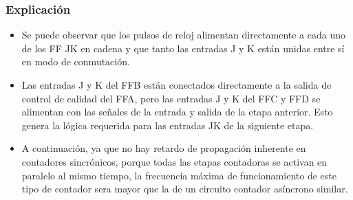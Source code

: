 \documentclass{beamer}
\begin{document}
\begin{frame}
\frametitle{Explicación}

\begin{itemize}
\item Se puede observar que los pulsos de reloj alimentan directamente a cada uno de los FF JK en cadena y que tanto las entradas J y K están unidas entre sí en modo de conmutación.

\item Las entradas J y K del FFB están conectados directamente a la salida de control de calidad del FFA, pero las entradas J y K del FFC y FFD se alimentan con las señales de la entrada y salida de la etapa anterior. Esto genera la lógica requerida para las entradas JK de la siguiente etapa.

\item A continuación, ya que no hay retardo de propagación inherente en contadores sincrónicos, porque todas las etapas contadoras se activan en paralelo al mismo tiempo, la frecuencia máxima de funcionamiento de este tipo de contador sera mayor que la de un circuito contador asíncrono similar.
\end{itemize}

\end{frame}
\end{document}
